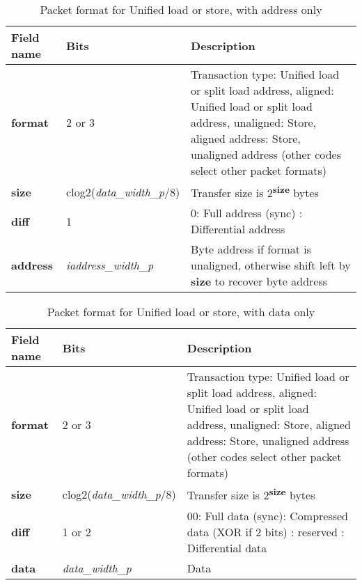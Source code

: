 \begin{table}[htp]
  \centering
  \caption{Packet format for Unified load or store, with address only}
  \label{tab:te_datadx0y1}
  \begin{tabulary}{\textwidth}{|l|p{40mm}|p{90mm}|}
    \hline
    {\bf Field name} & {\bf Bits} & {\bf Description} \\
    \hline
    \textbf{format} & 	2 or 3	& Transaction type: Unified load or split load address, aligned: Unified load or split load address, unaligned: Store, aligned address: Store, unaligned address\newline
		(other codes select other packet formats)\\
    \hline
    \textbf{size} & clog2(\textit{data\_width\_p}/8) & Transfer size is 2\textsuperscript{\textbf{size}} bytes \\
    \hline
    \textbf{diff} & 1 & 0: Full address (sync)	:  Differential address\\
    \hline
    \textbf{address} &  \textit{iaddress\_width\_p} & Byte address if format is unaligned, otherwise shift left by \textbf{size} to recover byte address \\
    \hline
  \end{tabulary}
\end{table}


\begin{table}[htp]
  \centering
  \caption{Packet format for Unified load or store, with data only}
  \label{tab:te_datadx0y2}
  \begin{tabulary}{\textwidth}{|l|p{40mm}|p{90mm}|}
    \hline
    {\bf Field name} & {\bf Bits} & {\bf Description} \\
    \hline
    \textbf{format} & 	2 or 3	& Transaction type: Unified load or split load address, aligned: Unified load or split load address, unaligned: Store, aligned address: Store, unaligned address\newline
		(other codes select other packet formats)\\
    \hline
    \textbf{size} & clog2(\textit{data\_width\_p}/8) & Transfer size is 2\textsuperscript{\textbf{size}} bytes \\
    \hline
    \textbf{diff} & 1 or 2 & 00: Full data (sync): Compressed data (XOR if 2 bits) : reserved : Differential data\\
    \hline
    \textbf{data} & \textit{data\_width\_p} & 
                Data\\
    \hline
  \end{tabulary}
\end{table}


